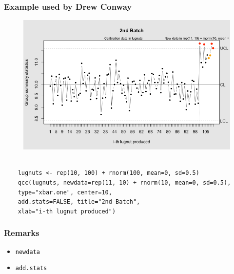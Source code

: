 \documentclass[MASTER-SPC.tex]{subfiles}
\begin{document}
\subsubsection{Example used by Drew Conway}
\begin{figure}[h!]
	\centering
	\includegraphics[width=0.7\linewidth]{./qcc_holdout2}
	\caption{}
	\label{fig:qcc_holdout2}
\end{figure}
\begin{framed}
	\begin{verbatim} 
	
	lugnuts <- rep(10, 100) + rnorm(100, mean=0, sd=0.5)
	qcc(lugnuts, newdata=rep(11, 10) + rnorm(10, mean=0, sd=0.5),
	type="xbar.one", center=10, 
	add.stats=FALSE, title="2nd Batch", 
	xlab="i-th lugnut produced")
	\end{verbatim}
\end{framed}

\subsubsection{Remarks}
{\large
	\begin{itemize}
		\item \texttt{newdata}
		\item \texttt{add.stats }
	\end{itemize}}
	
	
	
	
	
\end{document}
